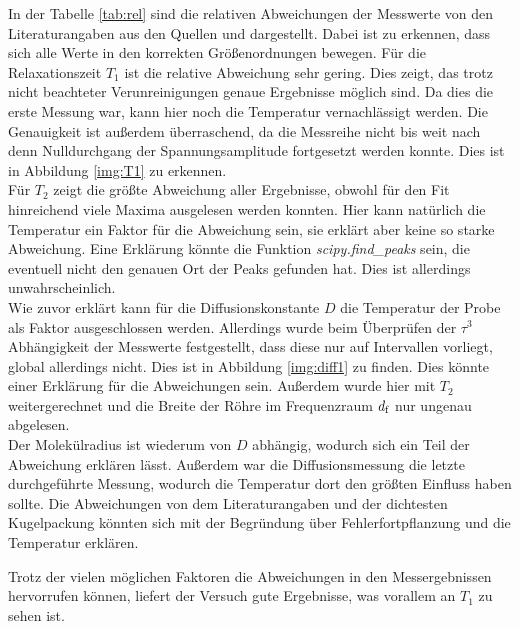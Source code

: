 \noindent
In der Tabelle \ref{tab:rel} sind die relativen Abweichungen der Messwerte von den Literaturangaben aus den Quellen \cite{theo} und \cite{radius} dargestellt.
Dabei ist zu erkennen, dass sich alle Werte in den korrekten Größenordnungen bewegen. Für die Relaxationszeit $T_1$ ist die relative Abweichung sehr gering. 
Dies zeigt, das trotz nicht beachteter Verunreinigungen genaue Ergebnisse möglich sind. Da dies die erste Messung war, kann hier noch die Temperatur vernachlässigt werden. 
Die Genauigkeit ist außerdem überraschend, da die Messreihe nicht bis weit nach denn Nulldurchgang der Spannungsamplitude fortgesetzt werden konnte. Dies ist in Abbildung \ref{img:T1} zu erkennen.\\
Für $T_2$ zeigt die größte Abweichung aller Ergebnisse, obwohl für den Fit hinreichend viele Maxima ausgelesen werden konnten. 
Hier kann natürlich die Temperatur ein Faktor für die Abweichung sein, sie erklärt aber keine so starke Abweichung. 
Eine Erklärung könnte die Funktion \textit{scipy.find\_peaks} sein, die eventuell nicht den genauen Ort der Peaks gefunden hat. Dies ist allerdings unwahrscheinlich.\\
Wie zuvor erklärt kann für die Diffusionskonstante $D$ die Temperatur der Probe als Faktor ausgeschlossen werden. 
Allerdings wurde beim Überprüfen der $\tau^3$ Abhängigkeit der Messwerte festgestellt, dass diese nur auf Intervallen vorliegt, global allerdings nicht.
Dies ist in Abbildung \ref{img:diff1} zu finden. Dies könnte einer Erklärung für die Abweichungen sein. Außerdem wurde hier mit $T_2$ weitergerechnet 
und die Breite der Röhre im Frequenzraum $d_{\text{f}}$ nur ungenau abgelesen.\\
Der Molekülradius ist wiederum von $D$ abhängig, wodurch sich ein Teil der Abweichung erklären lässt. 
Außerdem war die Diffusionsmessung die letzte durchgeführte Messung, wodurch die Temperatur dort den größten Einfluss haben sollte.
Die Abweichungen von dem Literaturangaben und der dichtesten Kugelpackung könnten sich mit der Begründung über Fehlerfortpflanzung und die Temperatur erklären.


\noindent
Trotz der vielen möglichen Faktoren die Abweichungen in den Messergebnissen hervorrufen können, liefert der Versuch gute Ergebnisse, was vorallem an $T_1$ zu sehen ist.
